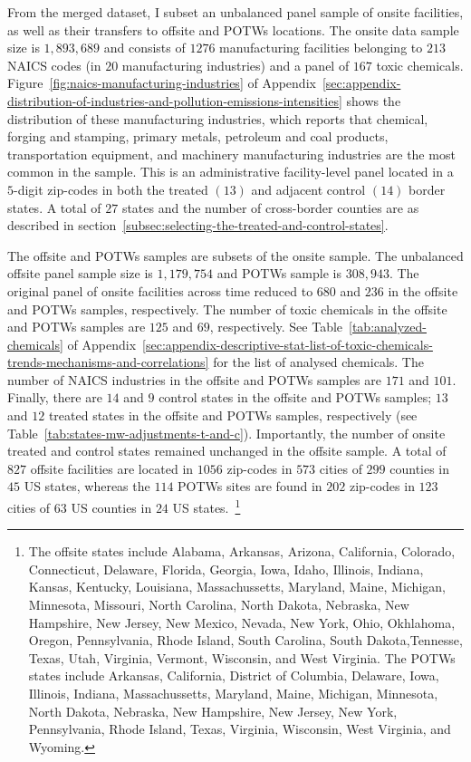 \documentclass[authoryear, preprint, twocolumn, 1p]{elsarticle}
\begin{document}
    From the merged dataset, I subset an unbalanced panel sample of onsite facilities, as well as their transfers to offsite and POTWs locations. The onsite data sample size is $1,893,689$ and consists of $1276$ manufacturing facilities belonging to $213$ NAICS codes (in $20$ manufacturing industries) and a panel of $167$ toxic chemicals. Figure~\ref{fig:naics-manufacturing-industries} of Appendix~\ref{sec:appendix-distribution-of-industries-and-pollution-emissions-intensities} shows the distribution of these manufacturing industries, which reports that chemical, forging and stamping, primary metals, petroleum and coal products, transportation equipment, and machinery manufacturing industries are the most common in the sample. This is an administrative facility-level panel located in a $5$-digit zip-codes in both the treated $(13)$ and adjacent control $(14)$ border states. A total of $27$ states and the number of cross-border counties are as described in section~\ref{subsec:selecting-the-treated-and-control-states}.

    The offsite and POTWs samples are subsets of the onsite sample. The unbalanced offsite panel sample size is $1,179,754$ and POTWs sample is $308,943$. The original panel of onsite facilities across time reduced to $680$ and $236$ in the offsite and POTWs samples, respectively. The number of toxic chemicals in the offsite and POTWs samples are $125$ and $69$, respectively. See Table~\ref{tab:analyzed-chemicals} of Appendix~\ref{sec:appendix-descriptive-stat-list-of-toxic-chemicals-trends-mechanisms-and-correlations} for the list of analysed chemicals. The number of NAICS industries in the offsite and POTWs samples are $171$ and $101$. Finally, there are $14$ and $9$ control states in the offsite and POTWs samples; $13$ and $12$ treated states in the offsite and POTWs samples, respectively (see Table~\ref{tab:states-mw-adjustments-t-and-c}). Importantly, the number of onsite treated and control states remained unchanged in the offsite sample. A total of $827$ offsite facilities are located in $1056$ zip-codes in $573$ cities of $299$ counties in $45$ US states, whereas the $114$ POTWs sites are found in $202$ zip-codes in $123$ cities of $63$ US counties in $24$ US states.~\footnote{\tiny The offsite states include Alabama, Arkansas, Arizona, California, Colorado, Connecticut, Delaware, Florida, Georgia, Iowa, Idaho, Illinois, Indiana, Kansas, Kentucky, Louisiana, Massachussetts, Maryland, Maine, Michigan, Minnesota, Missouri, North Carolina, North Dakota, Nebraska, New Hampshire, New Jersey, New Mexico, Nevada, New York, Ohio, Okhlahoma, Oregon, Pennsylvania, Rhode Island, South Carolina, South Dakota,Tennesse, Texas, Utah, Virginia, Vermont, Wisconsin, and West Virginia. The POTWs states include Arkansas, California, District of Columbia, Delaware, Iowa, Illinois, Indiana, Massachussetts, Maryland, Maine, Michigan, Minnesota, North Dakota, Nebraska, New Hampshire, New Jersey, New York, Pennsylvania, Rhode Island, Texas, Virginia, Wisconsin, West Virginia, and Wyoming.}
\end{document}
